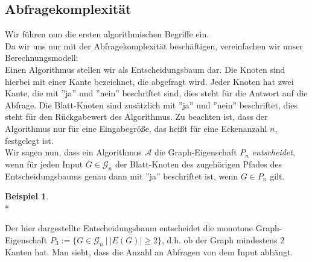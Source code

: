 \documentclass[a4paper]{scrreprt}
\theoremstyle{definition}
\newtheorem{example}{Beispiel}
\begin{document}
\subsection{Abfragekomplexität}
\label{sec:queryComplexity}

Wir führen nun die ersten algorithmischen Begriffe ein. \\
Da wir uns nur mit der Abfragekomplexität beschäftigen,
vereinfachen wir unser Berechnungsmodell: \\
Einen Algorithmus stellen wir als Entscheidungsbaum dar.
Die Knoten sind hierbei mit einer Kante bezeichnet, die
abgefragt wird. Jeder Knoten hat zwei Kante, die mit
''ja'' und ''nein'' beschriftet sind, dies steht für
die Antwort auf die Abfrage. Die Blatt-Knoten sind
zusätzlich mit ''ja'' und ''nein'' beschriftet,
dies steht für den Rückgabewert des Algorithmus.
Zu beachten ist, dass der Algorithmus nur für eine
Eingabegröße, das heißt für eine Eckenanzahl $n$,
festgelegt ist.\\
Wir sagen nun, dass ein Algorithmus $\mathcal{A}$
die Graph-Eigenschaft $P_n$ \emph{entscheidet}, wenn
für jeden Input $G \in \mathcal{G}_n$ der Blatt-Knoten
des zugehörigen Pfades des Entscheidungsbaums genau
dann mit ''ja'' beschriftet ist, wenn $G \in P_n$ gilt.

\begin{example} \ \\*
\label{exmpl:decisionTree}
\begin{center}
\end{center}
Der hier dargestellte Entscheidungsbaum entscheidet
die monotone Graph-Eigenschaft 
$P_3 := \big\{ G \in \mathcal{G}_n \ \big| \ |E(G)| \geq 2 \big\}$,
d.h. ob der Graph mindestens $2$ Kanten hat.
Man sieht, dass die Anzahl an Abfragen von
dem Input abhängt.
\end{example}
\end{document}
